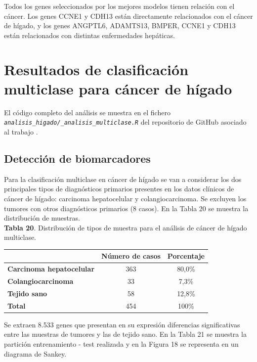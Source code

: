 Todos los genes seleccionados por los mejores modelos tienen relación con el cáncer. Los genes CCNE1
y CDH13 están directamente relacionados con el cáncer de hígado, y los genes ANGPTL6, ADAMTS13, BMPER, CCNE1
y CDH13 están relacionados con distintas enfermedades hepáticas.

\section{Resultados de clasificación multiclase para cáncer de hígado}

El código completo del análisis se muestra en el fichero \textit{\texttt{analisis\_higado/\_analisis\_multiclase.R}} del repositorio de GitHub asociado al trabajo \cite{Redondo-Sanchez2020}.

\subsection{Detección de biomarcadores}

Para la clasificación multiclase en cáncer de hígado se van a considerar los dos principales tipos de diagnósticos primarios presentes en los datos clínicos de cáncer de hígado: carcinoma hepatocelular y colangiocarcinoma. Se excluyen los tumores con otros diagnósticos primarios (8 casos). En la Tabla 20 se muestra la distribución de muestras.\\

\textbf{Tabla 20}. Distribución de tipos de muestra para el análisis de cáncer de hígado multiclase.

\begin{table}[H]
	\centering
	\begin{tabular}{lcc}
		\cline{2-3}
		& \textbf{Número de casos} & \textbf{Porcentaje} \\ \hline
		\textbf{Carcinoma hepatocelular}     & 363        & 80,0\%              \\
		\textbf{Colangiocarcinoma}     & 33        & 7,3\%              \\
		\textbf{Tejido sano} & 58         & 12,8\%              \\ \hline
		\textbf{Total}       & 454        & 100\%               \\ \hline
	\end{tabular}
\end{table}

Se extraen 8.533 genes que presentan en su expresión diferencias significativas entre las muestras de tumores y las de tejido sano. En la Tabla 21 se muestra la partición entrenamiento - test realizada y en la Figura 18 se representa en un diagrama de Sankey.\\

